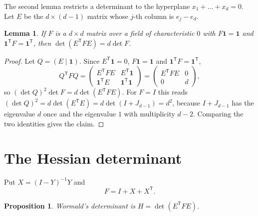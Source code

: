\documentclass[11pt,a4paper,reqno]{amsart}
\newtheorem{proposition}[theorem]{Proposition}
\newtheorem{lemma}[theorem]{Lemma}
\theoremstyle{remark}
\numberwithin{equation}{section}
\newcommand{\one}{\mathbf{1}}
\newcommand{\T}{\mathsf{T}}
\begin{document}
The second lemma restricts a determinant to the hyperplane $x_1+\dots+x_d=0$. Let $E$ be the $d\times(d-1)$ matrix whose $j$-th column is $e_j-e_d$.

\begin{lemma}\label{lem:border}
If $F$ is a $d\times d$ matrix over a field of characteristic $0$ with $F\one=\one$ and $\one^\T F=\one^\T$, then $\det(E^\T FE)=d\det F$.
\end{lemma}

\begin{proof}
Let $Q=(E\mid\one)$. Since $E^\T\one=0$, $F\one=\one$ and $\one^\T F=\one^\T$,
\[
Q^\T FQ=\begin{pmatrix}E^\T FE&E^\T\one\\ \one^\T E&\one^\T\one\end{pmatrix}=\begin{pmatrix}E^\T FE&0\\0&d\end{pmatrix},
\]
so $(\det Q)^2\det F=d\det(E^\T FE)$. For $F=I$ this reads $(\det Q)^2=d\det(E^\T E)=d\det(I+J_{d-1})=d^2$, because $I+J_{d-1}$ has the eigenvalue $d$ once and the eigenvalue $1$ with multiplicity $d-2$. Comparing the two identities gives the claim.
\end{proof}

\section{The Hessian determinant}\label{sec:hessian}

Put $X=(I-Y)^{-1}Y$ and
\begin{equation}\label{eq:F}
F=I+X+X^\T.
\end{equation}

\begin{proposition}\label{prop:hessian}
Wormald's determinant is $H=\det(E^\T FE)$.
\end{proposition}
\end{document}
